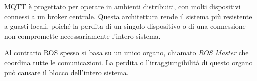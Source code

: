 \noindent MQTT è progettato per operare in ambienti distribuiti, con molti dispositivi connessi a un broker centrale. Questa architettura rende il sistema più resistente a guasti locali, poiché la perdita di un singolo dispositivo o di una connessione non compromette necessariamente l'intero sistema.

\noindent Al contrario ROS spesso si basa su un unico organo, chiamato \textit{ROS Master} che coordina tutte le comunicazioni. La perdita o l'irraggiungibilità di questo organo può causare il blocco dell'intero sistema.
